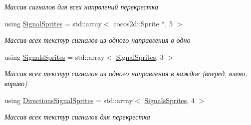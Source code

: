\begin{DoxyCompactItemize}
\begin{DoxyCompactList}\small\item\em Массив сигналов для всех напрвлений перекрестка \end{DoxyCompactList}\item 
using \hyperlink{namespacertm_ab6c6acbd1378bfe5755d77179a7131ff}{Signal\+Sprites} = std\+::array$<$ cocos2d\+::\+Sprite $\ast$, 5 $>$
\begin{DoxyCompactList}\small\item\em Массив всех текстур сигналов из одного направления в одно \end{DoxyCompactList}\item 
using \hyperlink{namespacertm_a260109b3376dc38095724ee80ed72d8e}{Signals\+Sprites} = std\+::array$<$ \hyperlink{namespacertm_ab6c6acbd1378bfe5755d77179a7131ff}{Signal\+Sprites}, 3 $>$
\begin{DoxyCompactList}\small\item\em Массив всех текстур сигналов из одного направления в каждое (вперед, влево, вправо) \end{DoxyCompactList}\item 
using \hyperlink{namespacertm_ac9f276c8ed33ee992eb1a1f04a8254a0}{Directions\+Signal\+Sprites} = std\+::array$<$ \hyperlink{namespacertm_a260109b3376dc38095724ee80ed72d8e}{Signals\+Sprites}, 4 $>$
\begin{DoxyCompactList}\small\item\em Массив всех текстур сигналов для перекрестка \end{DoxyCompactList}\end{DoxyCompactItemize}
